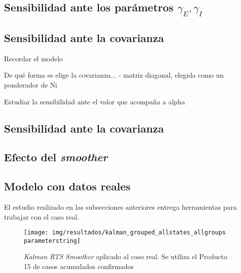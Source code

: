 \subsection{Sensibilidad ante los parámetros \(\gamma_E, \gamma_I\)} \label{subsec:sensigamma}

\subsection{Sensibilidad ante la covarianza} \label{subsec:sensicov}

Recordar el modelo 

De qué forma se elige la covarianza...
- matriz diagonal, elegida como un ponderador de Ni 

Estudiar la sensibilidad ante el valor que acompaña a alpha 

\subsection{Sensibilidad ante la covarianza}


\subsection{Efecto del \textit{smoother}}\label{subsec:smoother}

\subsection{Modelo con datos reales}\label{subsec:datosreales}

El estudio realizado en las subsecciones anteriores entrega herramientas para trabajar con el caso real.

\begin{figure}[!h]
\centering
\texttt{[image: img/resultados/kalman\_grouped\_allstates\_allgroups\\parameterstring]}
\caption[\textit{Kalman RTS Smoother} aplicado al caso real ]{\textit{Kalman RTS Smoother} aplicado al caso real. Se utiliza el Producto 15 de casos acumulados confirmados}
\label{all-nohigh}
\end{figure}



